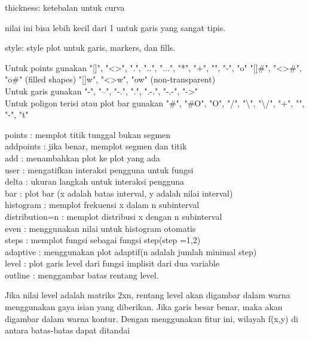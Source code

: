 \documentclass[a4paper,10pt]{article}
\begin{document}
\begin{eulernotebook}
\begin{eulercomment}
\begin{eulercomment}
\begin{eulercomment}
thickness: ketebalan untuk curva

nilai ini bisa lebih kecil dari 1 untuk garis yang sangat tipis.

style: style plot untuk garis, markers, dan fills.

Untuk points gunakan "[]", "\textless{}\textgreater{}", ".", "..", "...", "*", "+", "\textbar{}", "-",
"o" "[]#", "\textless{}\textgreater{}#", "o#" (filled shapes) "[]w", "\textless{}\textgreater{}w", "ow"
(non-transparent) \\
Untuk garis gunakan "-", "--", "-.", ".", ".-.", "-.-", "-\textgreater{}" \\
Untuk poligon terisi atau plot bar gunakan "#", "#O", "O", "/", "\textbackslash{}",
"\textbackslash{}/", "+", "\textbar{}", "-", "t"

points : memplot titik tunggal bukan segmen\\
addpoints : jika benar, memplot segmen dan titik\\
add : menambahkan plot ke plot yang ada\\
user : mengatifkan interaksi pengguna untuk fungsi\\
delta : ukuran langkah untuk interaksi pengguna\\
bar : plot bar (x adalah batas interval, y adalah nilai interval)\\
histogram : memplot frekuensi x dalam n subinterval\\
distribution=n : memplot distribusi x dengan n subinterval\\
even : menggunakan nilai untuk histogram otomatis\\
steps : memplot fungsi sebagai fungsi step(step =1,2)\\
adaptive : menggunakan plot adaptif(n adalah jumlah minimal step)\\
level : plot garis level dari fungsi implisit dari dua variable\\
outline : menggambar batas rentang level.

Jika nilai level adalah matriks 2xn, rentang level akan digambar dalam
warna menggunakan gaya isian yang diberikan. Jika garis besar benar,
maka akan digambar dalam warna kontur. Dengan menggunakan fitur ini,
wilayah f(x,y) di antara batas-batas dapat ditandai


\end{eulercomment}
\end{eulercomment}
\end{eulercomment}
\end{eulernotebook}
\end{document}
